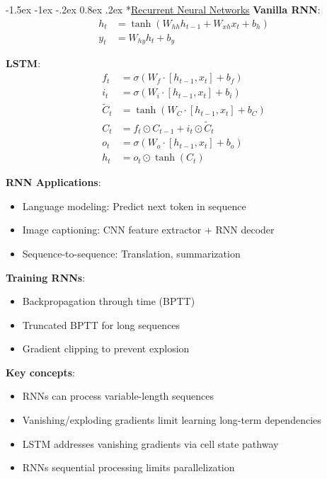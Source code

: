 \documentclass{article}
\makeatletter
\renewcommand\section{\@startsection{section}{1}{\z@}%
                                  {-1.5ex \@plus -1ex \@minus -.2ex}%
                                  {0.8ex \@plus.2ex}%
                                  {\normalfont\small\bfseries}}
\makeatother
\begin{document}
\begin{multicols}{3}
\section*{\underline{Recurrent Neural Networks}}
\textbf{Vanilla RNN}:
\begin{align*}
h_t &= \tanh(W_{hh}h_{t-1} + W_{xh}x_t + b_h)\\
y_t &= W_{hy}h_t + b_y
\end{align*}

\textbf{LSTM}:
\begin{align*}
f_t &= \sigma(W_f \cdot [h_{t-1}, x_t] + b_f)\\
i_t &= \sigma(W_i \cdot [h_{t-1}, x_t] + b_i)\\
\tilde{C}_t &= \tanh(W_C \cdot [h_{t-1}, x_t] + b_C)\\
C_t &= f_t \odot C_{t-1} + i_t \odot \tilde{C}_t\\
o_t &= \sigma(W_o \cdot [h_{t-1}, x_t] + b_o)\\
h_t &= o_t \odot \tanh(C_t)
\end{align*}

\textbf{RNN Applications}:
\begin{itemize}
\item Language modeling: Predict next token in sequence
\item Image captioning: CNN feature extractor + RNN decoder
\item Sequence-to-sequence: Translation, summarization
\end{itemize}

\textbf{Training RNNs}:
\begin{itemize}
\item Backpropagation through time (BPTT)
\item Truncated BPTT for long sequences
\item Gradient clipping to prevent explosion
\end{itemize}

\textbf{Key concepts}:
\begin{itemize}
\item RNNs can process variable-length sequences
\item Vanishing/exploding gradients limit learning long-term dependencies
\item LSTM addresses vanishing gradients via cell state pathway
\item RNNs sequential processing limits parallelization
\end{itemize}


\end{multicols}
\end{document}
